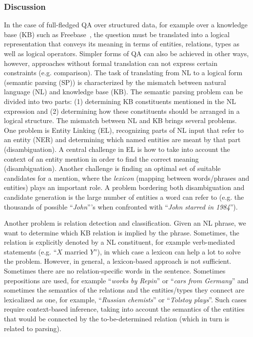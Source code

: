 \subsubsection{Discussion}
In the case of full-fledged QA over structured data, for example over a knowledge base (KB) such as Freebase~\cite{bollacker2008freebase}, the question must be translated into a logical representation that conveys its meaning in terms of entities, relations, types as well as logical operators. Simpler forms of QA can also be achieved in other ways, however, approaches without formal translation can not express certain constraints (e.g. comparison).
The task of translating from NL to a logical form (semantic parsing (SP)) is characterized by the mismatch between natural language (NL) and knowledge base (KB).
The semantic parsing problem can be divided into two parts: (1) determining KB constituents mentioned in the NL expression and (2) determining how these constituents should be arranged in a logical structure.
The mismatch between NL and KB brings several problems.
One problem is Entity Linking (EL), recognizing parts of NL input that refer to an entity (NER) and determining which named entities are meant by that part (disambiguation).
A central challenge in EL is how to take into account the context of an entity mention in order to find the correct meaning (disambiguation).
Another challenge is finding an optimal set of suitable candidates for a mention, where the \emph{lexicon} (mapping between words/phrases and entities) plays an important role. A problem bordering both disambiguation and candidate generation is the large number of entities a word can refer to (e.g. the thousands of possible ``\textit{John}'''s when confronted with ``\textit{John starred in 1984}'').

Another problem is relation detection and classification.
Given an NL phrase, we want to determine which KB relation is implied by the phrase. Sometimes, the relation is explicitly denoted by a NL constituent, for example verb-mediated statements (e.g. ``$X$ married $Y$''), in which case a lexicon can help a lot to solve the problem.
However, in general, a lexicon-based approach is not sufficient.
Sometimes there are no relation-specific words in the sentence.
Sometimes prepositions are used, for example ``\textit{works by Repin}'' or ``\textit{cars from Germany}'' and sometimes the semantics of the relations and the entities/types they connect are lexicalized as one, for example, ``\textit{Russian chemists}'' or ``\textit{Tolstoy plays}''.
Such cases require context-based inference, taking into account the semantics of the entities that would be connected by the to-be-determined relation (which in turn is related to parsing).

